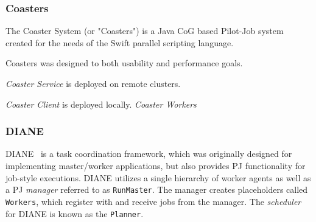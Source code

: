 \documentclass{sig-alternate}
\begin{document}
%
\subsubsection{Coasters}

The Coaster System (or "Coasters") is a Java CoG based Pilot-Job system
created for the needs of the Swift parallel scripting language.

Coasters was designed to both usability and performance goals.


\textit{Coaster Service} is deployed on remote clusters.

\textit{Coaster Client} is deployed locally.
\textit{Coaster Workers} 



%
\subsubsection{DIANE}


DIANE~\cite{Moscicki:908910} is a task coordination framework, which
was originally designed for implementing master/worker applications,
but also provides PJ functionality for job-style executions.
DIANE utilizes a single hierarchy of worker agents as well as a PJ \textit{manager}
referred to as \texttt{RunMaster}.  The manager creates
placeholders called \texttt{Workers}, which register with and receive jobs from the manager.
The \textit{scheduler} for DIANE is known as the \texttt{Planner}.

\end{document}
